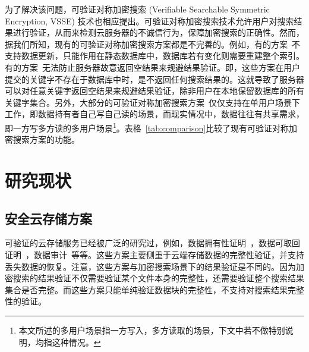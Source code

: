 为了解决该问题，可验证对称加密搜索 (Verifiable Searchable Symmetric Encryption, VSSE) 技术也相应提出\cite{kamara2011cs2,kurosawa2012uc,chai2012verifiable,kurosawa2013update,stefanov2014practical,cheng2015verifiable,bost2016verifiable,ogataefficient}。可验证对称加密搜索技术允许用户对搜索结果进行验证，从而来检测云服务器的不诚信行为，保障加密搜索的正确性。然而，据我们所知，现有的可验证对称加密搜索方案都是不完善的。例如，有的方案~\cite{kurosawa2012uc,chai2012verifiable,cheng2015verifiable,ogataefficient}不支持数据更新，只能作用在静态数据库中，数据库若有变化则需要重建整个索引。有的方案~\cite{kamara2011cs2,kurosawa2013update,stefanov2014practical}无法防止服务器故意返回空结果来规避结果验证。即，这些方案\cite{kamara2011cs2,kurosawa2013update,stefanov2014practical}在用户提交的关键字不存在于数据库中时，是不返回任何搜索结果的。这就导致了服务器可以对任意关键字返回空结果来规避结果验证，除非用户在本地保留数据库的所有关键字集合。另外，大部分的可验证对称加密搜索方案~\cite{kamara2011cs2,kurosawa2012uc,chai2012verifiable,kurosawa2013update,stefanov2014practical,
cheng2015verifiable,ogataefficient,bost2016verifiable}仅仅支持在单用户场景下工作，即数据持有者自己写自己读的场景，而现实情况中，数据往往有共享需求，即一方写多方读的多用户场景\footnote{本文所述的多用户场景指一方写入，多方读取的场景，下文中若不做特别说明，均指这种情况。}。表格~\ref{tab:comparison}比较了现有可验证对称加密搜索方案的功能。




\section{研究现状}
\subsection{安全云存储方案}
可验证的云存储服务已经被广泛的研究过，例如，数据拥有性证明~\cite{ateniese2007provable, ateniese2008scalable,curtmola2008mr, erway2015dynamic,zhu2012cooperative}，数据可取回证明~\cite{juels2007pors, bowers2009proofs, stefanov2012iris}，数据审计~\cite{wang2010privacy,wang2010toward,wang2013privacy,wang2011enabling,zhu2011dynamic}等等。这些方案主要侧重于云端存储数据的完整性验证，并支持丢失数据的恢复。注意，这些方案与加密搜索场景下的结果验证是不同的。因为加密搜索的结果验证不仅需要验证某个文件本身的完整性，还需要验证整个搜索结果集合是否完整。而这些方案只能单纯验证数据块的完整性，不支持对搜索结果完整性的验证。

